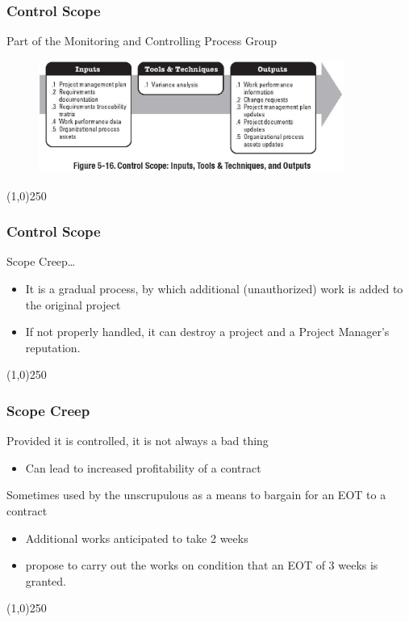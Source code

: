 \begin{frame}
\frametitle{Control Scope}{Part of the Monitoring and Controlling Process Group}
\begin{figure}
	\centering
		\includegraphics[width = 10cm]{images/Fig5-16.jpg}
	\label{fig:5-16}
\end{figure}
\end{frame}\begin{center}\line(1,0){250}\end{center}



\begin{frame}
\frametitle{Control Scope}
Scope Creep\ldots
\begin{itemize}
	\item It is a gradual process, by which additional (unauthorized) work is added to the original project 
	\item If not properly handled, it can destroy a project and a Project Manager's reputation.
\end{itemize}
\end{frame}\begin{center}\line(1,0){250}\end{center}



\begin{frame}
\frametitle{Scope Creep}
Provided it is controlled, it is not always a bad thing
\begin{itemize}
	\item Can lead to increased profitability of a contract
\end{itemize}
Sometimes used by the unscrupulous as  a means to bargain for an EOT to a contract
\begin{itemize}
	\item Additional works anticipated to take 2 weeks
	\item propose to carry out the works on condition that an EOT of 3 weeks is granted.
\end{itemize}
\end{frame}\begin{center}\line(1,0){250}\end{center}



